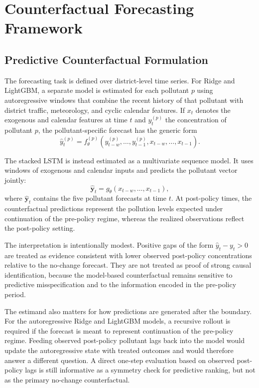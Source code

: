 \section{Counterfactual Forecasting Framework}\label{sec:framework}

\subsection{Predictive Counterfactual Formulation}

The forecasting task is defined over district-level time series. For Ridge and LightGBM, a separate model is estimated for each pollutant $p$ using autoregressive windows that combine the recent history of that pollutant with district traffic, meteorology, and cyclic calendar features. If $x_t$ denotes the exogenous and calendar features at time $t$ and $y_t^{(p)}$ the concentration of pollutant $p$, the pollutant-specific forecast has the generic form
\[
\hat{y}_t^{(p)} = f_{\theta}^{(p)}(y_{t-w}^{(p)}, \ldots, y_{t-1}^{(p)}, x_{t-w}, \ldots, x_{t-1}).
\]

The stacked LSTM is instead estimated as a multivariate sequence model. It uses windows of exogenous and calendar inputs and predicts the pollutant vector jointly:
\[
\hat{\mathbf{y}}_t = g_{\theta}(x_{t-w}, \ldots, x_{t-1}),
\]
where $\hat{\mathbf{y}}_t$ contains the five pollutant forecasts at time $t$. At post-policy times, the counterfactual predictions represent the pollution levels expected under continuation of the pre-policy regime, whereas the realized observations reflect the post-policy setting.

The interpretation is intentionally modest. Positive gaps of the form $\hat{y}_t - y_t > 0$ are treated as evidence consistent with lower observed post-policy concentrations relative to the no-change forecast. They are not treated as proof of strong causal identification, because the model-based counterfactual remains sensitive to predictive misspecification and to the information encoded in the pre-policy period.

The estimand also matters for how predictions are generated after the boundary. For the autoregressive Ridge and LightGBM models, a recursive rollout is required if the forecast is meant to represent continuation of the pre-policy regime. Feeding observed post-policy pollutant lags back into the model would update the autoregressive state with treated outcomes and would therefore answer a different question. A direct one-step evaluation based on observed post-policy lags is still informative as a symmetry check for predictive ranking, but not as the primary no-change counterfactual.

